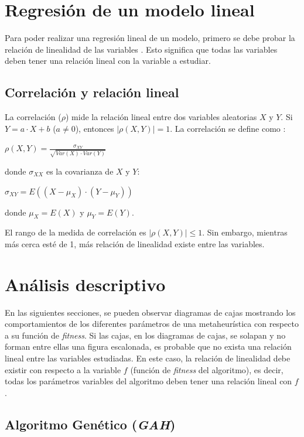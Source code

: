\section{Regresión de un modelo lineal}

    Para poder realizar una regresión lineal de un modelo, primero
se debe probar la relación de linealidad de las variables \cite{AB_0}. Esto
significa que todas las variables deben tener una relación lineal
con la variable a estudiar.

\subsection{Correlación y relación lineal}

    La correlación ($\rho$) mide la relación lineal entre dos variables
aleatorias $X$ y $Y$. Si $Y = a \cdot X + b$ ($a \neq 0$), entonces
$|\rho(X, Y)| = 1$. La correlación se define como \cite{AB_0}:
\begin{center}
    $\rho(X,Y) = \displaystyle\frac{\sigma_{XY}}{\sqrt{Var(X) \cdot Var(Y)}}$
\end{center}
donde $\sigma_{XX}$ es la covarianza de $X$ y $Y$:
\begin{center}
    $\sigma_{XY} = E((X - \mu_X)\cdot(Y - \mu_Y))$
\end{center}
donde $\mu_X = E(X)$ y $\mu_Y = E(Y)$.

    El rango de la medida de correlación es $|\rho(X,Y)| \leq 1$.
Sin embargo, mientras más cerca esté de 1, más relación de linealidad
existe entre las variables.

\section{Análisis descriptivo}

    En las siguientes secciones, se pueden observar diagramas de cajas mostrando
los comportamientos de los diferentes parámetros de una metaheurística con
respecto a su función de \emph{fitness}. Si las cajas, en los diagramas de cajas,
se solapan y no forman entre ellas una figura escalonada, es probable que no
exista una relación lineal entre las variables estudiadas. En este caso, la
relación de linealidad debe existir con respecto a la variable $f$ (función de
\emph{fitness} del algoritmo), es decir, todas los parámetros variables del
algoritmo deben tener una relación lineal con $f$.

\subsection{Algoritmo Genético (\emph{GAH})}\label{sect:iga-rv}

